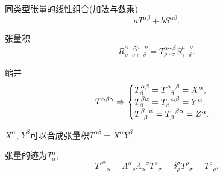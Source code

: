 \documentclass[hidelinks]{ctexart}
\begin{document}
\begin{cenum}
    \item 同类型张量的线性组合(加法与数乘)
    \[ aT^{\alpha\beta} + bS^{\alpha\beta}. \]
    \item 张量积
    \[ R^{\alpha\cdots\beta\mu\cdots\nu}_{\rho\cdots\sigma\gamma\cdots\delta} = T^{\alpha\cdots\beta}_{\rho\cdots\sigma}S^{\mu\cdots\nu}_{\gamma\cdots\delta}. \]
    \item 缩并
    \[ T^{\alpha\beta\gamma} \Rightarrow \begin{cases}
        T^{\alpha\beta}_\beta = \tensor{T}{^\alpha_\beta^\beta} = X^\alpha, \\
        T^{\beta\alpha}_\beta = \tensor{T}{_\beta^\alpha^\beta} = Y^\alpha, \\
        \tensor{T}{^\beta_\beta^\alpha} = \tensor{T}{_\beta^\beta^\alpha} = Z^\alpha.
    \end{cases} \]
\end{cenum}
\begin{sample}
    \begin{ex}
        $X^\alpha$, $Y^\beta$可以合成张量积$T^{\alpha\beta} = X^\alpha Y^\beta$.
    \end{ex}
\end{sample}
\begin{sample}
    \begin{ex}
        张量的迹为$T^\alpha_\alpha$,
        \[ {T'^\alpha}_\alpha = {\Lambda^\alpha}_\rho {\Lambda_\alpha}^\sigma {T^\rho}_\sigma = \delta^\sigma_\rho {T^\rho}_\sigma = {T^\rho}_\rho. \]
    \end{ex}
\end{sample}
\end{document}
